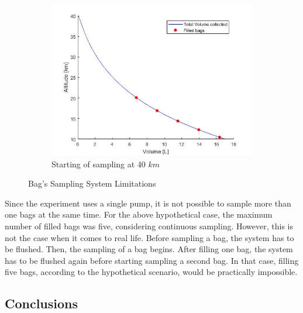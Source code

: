 \begin{figure}[H]
\begin{subfigure}{0.45\textwidth}
    \centering\includegraphics[width=1.2\textwidth]{appendix/img/samplevolume40km.png}
    \caption{Starting of sampling at 40 $km$}
  \end{subfigure}
  \caption{Bag's Sampling System Limitations}\label{fig:limits}
\end{figure}
 


Since the experiment uses a single pump, it is not possible to sample more than one bags at the same time. For the above hypothetical case, the maximum number of filled bags was five, considering continuous sampling. However, this is not the case when it comes to real life. Before sampling a bag, the system has to be flushed. Then, the sampling of a bag begins. After filling one bag, the system has to be flushed again before starting sampling a second bag. In that case, filling five bags, according to the hypothetical scenario, would be practically impossible.


\newpage
\subsection{Conclusions}


